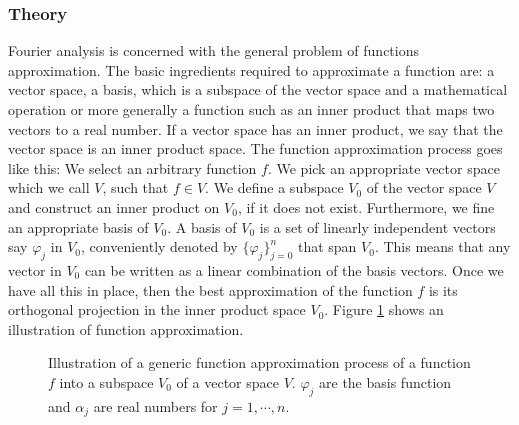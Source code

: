 \documentclass[11pt, oneside]{article}   	%
\begin{document}
\subsubsection{Theory}
Fourier analysis is concerned with the general problem of functions approximation. The basic ingredients required to approximate a function are: a vector space, a basis, which is a subspace of the vector space and a mathematical operation or more generally a function such as an inner product that maps two vectors to a real number. If a vector space has an inner product, we say that the vector space is an inner product space. 
\justify
The function approximation process goes like this: We select an arbitrary function $f$. We pick an appropriate vector space which we call $V$, such that $f\in V$. We define a subspace $V_{0}$ of the vector space $V$ and construct an inner product on $V_{0}$, if it does not exist. Furthermore, we fine an appropriate basis of $V_{0}$.  A basis of $V_{0}$ is a set of linearly independent vectors say $\varphi_{j}$ in $V_{0}$, conveniently denoted by $\{ \varphi_{j}\}_{j=0}^{n}$ that span $V_{0}$. This means that any vector in $V_{0}$ can be written as a linear combination of the basis vectors. Once we have all this in place, then the best approximation of the function $f$ is its orthogonal projection in the inner product space $V_{0}$. Figure \ref{figure:il} shows an illustration of function approximation.
\justify
\begin{figure}[H]
\begin{center}
\end{center}
\caption{Illustration of a generic function approximation process of a function $f$ into a subspace $V_{0}$ of a vector space $V$. $\varphi_{j}$ are the basis function and $\alpha_{j}$ are real numbers for $j=1,\cdots,n$.}
\label{figure:il}
\end{figure}
\end{document}
